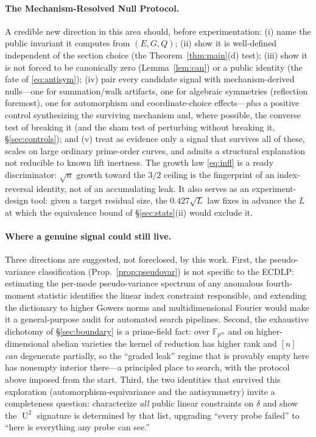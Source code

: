 \documentclass[11pt]{article}
\theoremstyle{definition}
\DeclareMathOperator{\Uk}{U}
\begin{document}
\paragraph{The Mechanism-Resolved Null Protocol.} A credible new
direction in this area should, before experimentation: (i) name the
public invariant it computes from $(E,G,Q)$; (ii) show it is well-defined
independent of the section choice (the Theorem~\ref{thm:main}(d) test);
(iii) show it is not forced to be canonically zero (Lemma~\ref{lem:can})
or a public identity (the fate of \eqref{eq:antisym}); (iv) pair every
candidate signal with mechanism-derived nulls---one for summation/walk
artifacts, one for algebraic symmetries (reflection foremost), one for
automorphism and coordinate-choice effects---\emph{plus} a positive
control synthesizing the surviving mechanism and, where possible, the
converse test of breaking it (and the sham test of perturbing without
breaking it, \S\ref{sec:controls}); and (v) treat as evidence only a
signal that survives all of these, scales on large ordinary prime-order
curves, and admits a structural explanation not reducible to known lift
inertness. The growth law \eqref{eq:infl} is a ready discriminator:
$\sqrt n$ growth toward the $3/2$ ceiling is the fingerprint of an
index-reversal identity, not of an accumulating leak. It also serves as
an experiment-design tool: given a target residual size, the
$0.427\sqrt L$ law fixes in advance the $L$ at which the equivalence
bound of \S\ref{sec:stats}(ii) would exclude it.

\paragraph{Where a genuine signal could still live.} Three directions are
suggested, not foreclosed, by this work. First, the pseudo-variance
classification (Prop.~\ref{prop:pseudovar}) is not specific to the ECDLP:
estimating the per-mode pseudo-variance spectrum of any anomalous
fourth-moment statistic identifies the linear index constraint
responsible, and extending the dictionary to higher Gowers norms and
multidimensional Fourier would make it a general-purpose audit for
automated search pipelines. Second, the exhaustive dichotomy of
\S\ref{sec:boundary} is a prime-field fact: over $\mathbb F_{p^m}$ and on
higher-dimensional abelian varieties the kernel of reduction has higher
rank and $[n]$ \emph{can} degenerate partially, so the ``graded leak''
regime that is provably empty here has nonempty interior there---a
principled place to search, with the protocol above imposed from the
start. Third, the two identities that survived this exploration
(automorphism-equivariance and the antisymmetry) invite a completeness
question: characterize \emph{all} public linear constraints on $\delta$
and show the $\Uk^2$ signature is determined by that list, upgrading
``every probe failed'' to ``here is everything any probe can see.''
\end{document}
